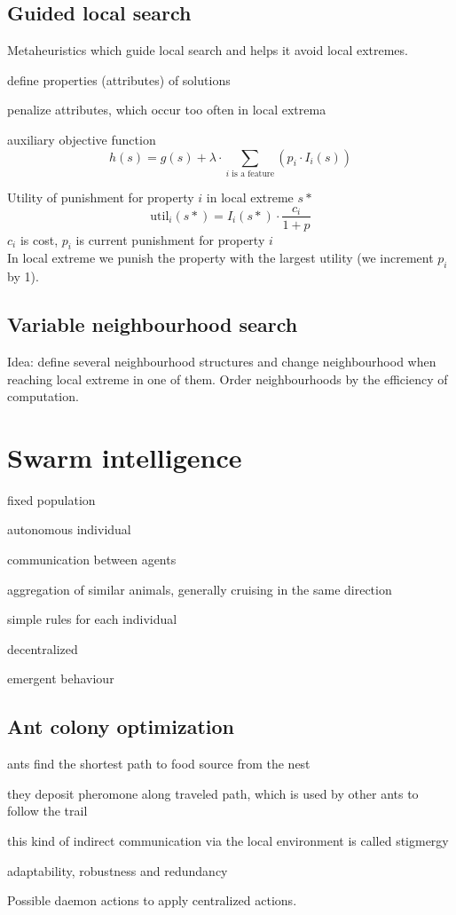 \documentclass{article}
\begin{document}
\begin{multicols*}{2}
{\subsection{Guided local search}
Metaheuristics which guide local search and helps it avoid local extremes.
\begin{compactitem}
	\item define properties (attributes) of solutions
	\item penalize attributes, which occur too often in local extrema
	\item auxiliary objective function
	\[h(s) = g(s) + \lambda \cdot \sum_{i\text{ is a feature}}(p_i\cdot I_i(s))\]
\end{compactitem}
Utility of punishment for property $i$ in local extreme $s*$
\[
\text{util}_i(s*) = I_i(s*) \cdot \frac{c_i}{1+p}
\]
$c_i$ is cost, $p_i$ is current punishment for property $i$ \\
In local extreme we punish the property with the largest utility (we increment $p_i$ by 1).
\subsection{Variable neighbourhood search}
Idea: define several neighbourhood structures and change neighbourhood when reaching local extreme
in one of them. Order neighbourhoods by the efficiency of computation.

\section{Swarm intelligence}
\begin{compactitem}
	\item fixed population
	\item autonomous individual
	\item communication between agents
	\item aggregation of similar animals, generally cruising in the same direction
	\item simple rules for each individual
	\item decentralized
	\item emergent behaviour
\end{compactitem}
\subsection{Ant colony optimization}
\begin{compactitem}
	\item ants find the shortest path to food source from the nest
	\item they deposit pheromone along traveled path, which is used by other ants to follow the trail
	\item this kind of indirect communication via the local environment is called stigmergy
	\item adaptability, robustness and redundancy
\end{compactitem}
Possible daemon actions to apply centralized actions.
}
\end{multicols*}
\end{document}
